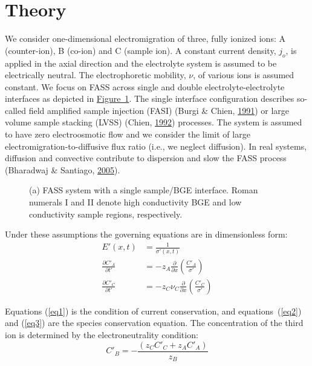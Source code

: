 \documentclass[lineno,authoryear]{FLO_v1}%
\theoremstyle{definition}
\begin{document}
\section{Theory}

We consider one-dimensional electromigration of three,
fully ionized ions: A (counter-ion), B (co-ion) and C
(sample ion). A constant current density, $j_{o}$, is
applied in the axial direction and the electrolyte system
is assumed to be electrically neutral. The electrophoretic
mobility, $\nu$, of various ions is assumed constant. We
focus on FASS across single and double
electrolyte-electrolyte interfaces as depicted in
\hyperref[fig1]{Figure~1}. The single interface
configuration describes so-called field amplified sample
injection (FASI) (Burgi \& Chien, \hyperlink{bib4}{1991})
or large volume sample stacking (LVSS) (Chien,
\hyperlink{bib6}{1992}) processes. The system is assumed to
have zero electroosmotic flow and we consider the limit of
large electromigration-to-diffusive flux ratio (i.e., we
neglect diffusion). In real systems, diffusion and
convective contribute to dispersion and slow the FASS
process (Bharadwaj \& Santiago, \hyperlink{bib1}{2005}).

\begin{figure}[]
\caption{(a) FASS system with a single sample/BGE interface.
Roman numerals I and II denote high conductivity BGE
and low conductivity sample regions, respectively.}
\label{fig1}
\end{figure}

Under these assumptions the governing equations are in
dimensionless form:
\begin{align}
{E}'(x,t)&=\frac{1}{{\sigma }'(x,t)}\label{eq1}\\[6pt]
\frac{\partial {C}'_A }{\partial {t}'}&=-z_A \frac{\partial
}{\partial x}\left( {\frac{{C}'_A }{{\sigma }'}} \right)\label{eq2}\\[6pt]
\frac{\partial {C}'_C }{\partial {t}'}&=-z_C \nu _C
\frac{\partial }{\partial x}\left( {\frac{{C}'_C }{{\sigma
}'}} \right)\label{eq3}
\end{align}

Equations (\ref{eq1}) is the condition of current
conservation, and equations~(\ref{eq2}) and (\ref{eq3}) are
the species conservation equation. The concentration of the
third ion is determined by the electroneutrality condition:
\begin{equation}\label{eq4}
{C}'_B =-\frac{\left( {z_C {C}'_C +z_A {C}'_A } \right)}{z_B }
\end{equation}
\end{document}
